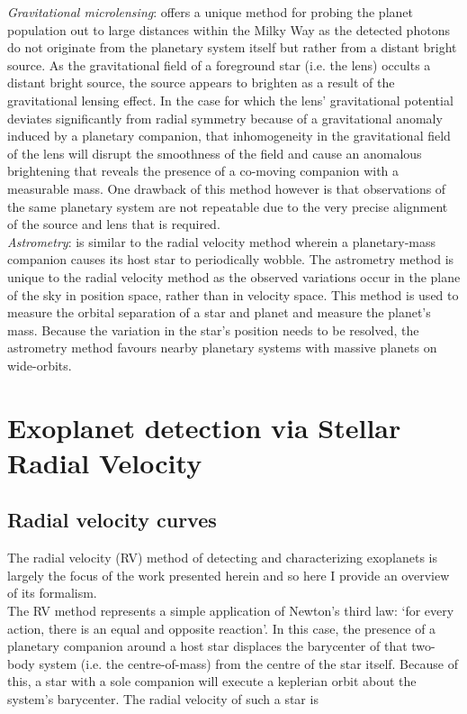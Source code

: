 \emph{Gravitational microlensing}:
offers a unique method for probing the planet population out to large distances
within the Milky Way as the detected photons do not originate from the planetary system itself
but rather from a distant bright source. As the gravitational field of a
foreground star (i.e. the lens) occults a distant bright source, the source appears to
brighten as a result of the gravitational lensing effect. In the case for which the lens' gravitational
potential deviates significantly from radial symmetry because of a gravitational anomaly induced by a
planetary companion, that inhomogeneity in the gravitational field of the lens will disrupt the smoothness
of the field and cause an anomalous brightening that reveals the presence of a co-moving companion with
a measurable mass. One drawback of this method however is that observations of the same planetary
system are not repeatable due to the very precise alignment of the source and lens that is required. \\

\emph{Astrometry}: is similar to the radial velocity method wherein a planetary-mass companion
causes its host star to periodically wobble. The astrometry method is unique to the radial velocity
method as the observed variations occur in the plane of the sky in position space, rather than in velocity
space. This method is used to measure the orbital separation of a
star and planet and measure the planet's mass. Because the variation in the star's position
needs to be resolved, the astrometry method favours nearby planetary systems with massive
planets on wide-orbits. \\


\section{Exoplanet detection via Stellar Radial Velocity} \label{sect:rv}
\subsection{Radial velocity curves}
The radial velocity (RV) method of detecting and characterizing exoplanets is largely
the focus of the work presented herein and so here I provide an overview of its formalism. \\

The RV method represents a simple 
application of Newton's third law: `for every action, there is an equal 
and opposite reaction'. In this case, the presence of a planetary companion around a 
host star displaces the barycenter of that two-body system (i.e. the centre-of-mass) from the
centre of the star itself. Because of this, a star with a sole companion 
will execute a keplerian orbit about the system's barycenter. The radial velocity of such a star
is

